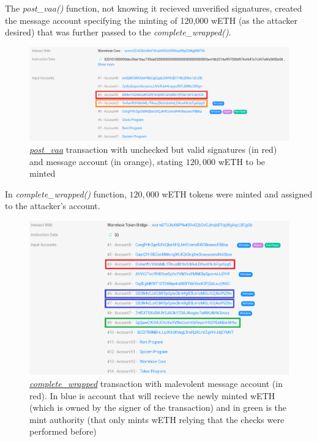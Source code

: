 \documentclass[fleqn,10pt]{olplainarticle}
\begin{document}
The \emph{post\_vaa()} function, not knowing it recieved unverified signatures, created the message account specifying the minting of 120,000 wETH (as the attacker desired) that was further passed to the \emph{complete\_wrapped()}.

\begin{figure}[h!]
  \centering
  \includegraphics[width=\linewidth]{images/post_vaa.png}
  \caption{\href{https://solscan.io/tx/2SohoVoPDSdzgsGCgKQPByKQkLAXHrYmvtE7EEqwKi3qUBTGDDJ7DcfYS7YJC2f8xwKVVa6SFUpH5MZ5xcyn1BCK}{\color{blue}\emph{\underline{post\_vaa}}} transaction with unchecked but valid signatures (in red) and message account (in orange), stating $120,000$ wETH to be minted}
  \label{fig:post_vaa}
\end{figure}


In \emph{complete\_wrapped()} function, $120,000$ wETH tokens were minted and assigned to the attacker's account.

\begin{figure}[h!]
  \centering
  \includegraphics[width=\linewidth]{images/complete_wrapped.png}
  \caption{\href{https://solscan.io/tx/2zCz2GgSoSS68eNJENWrYB48dMM1zmH8SZkgYneVDv2G4gRsVfwu5rNXtK5BKFxn7fSqX9BvrBc1rdPAeBEcD6Es}{\color{blue}\emph{\underline{complete\_wrapped}}} transaction with malevolent message account (in red). In blue is account that will recieve the newly minted wETH (which is owned by the signer of the transaction) and in green is the mint authority (that only mints wETH relying that the checks were performed before)}
  \label{fig:complete_wrapped}
\end{figure}
\end{document}
